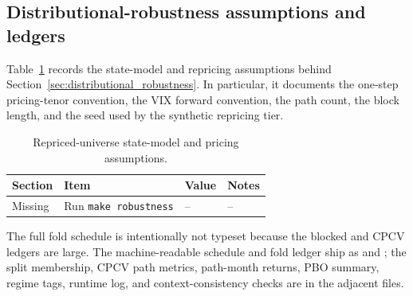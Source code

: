 \clearpage

\subsection{Distributional-robustness assumptions and ledgers}

Table~\ref{tab:mc_repriced_assumptions_app} records the state-model and repricing
assumptions behind Section~\ref{sec:distributional_robustness}. In particular, it
documents the one-step pricing-tenor convention, the VIX forward convention, the path
count, the block length, and the seed used by the synthetic repricing tier.

\begin{table}[H]
\centering
\scriptsize
{}
  {\resizebox{\textwidth}{!}{}}
  {\begin{tabular}{llll}\toprule Section & Item & Value & Notes \\\midrule Missing & Run \texttt{make robustness} & -- & -- \\\bottomrule\end{tabular}}
\caption{Repriced-universe state-model and pricing assumptions.}
\label{tab:mc_repriced_assumptions_app}
\end{table}

The full fold schedule is intentionally not typeset because the blocked and CPCV ledgers
are large. The machine-readable schedule and fold ledger ship as
 and ; the split
membership, CPCV path metrics, path-month returns, PBO summary, regime tags, runtime log,
and context-consistency checks are in the adjacent  files.
